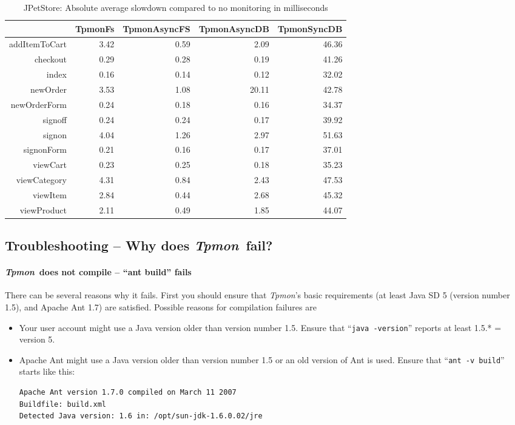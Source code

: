 \documentclass[a4paper,12pt]{scrartcl}
\newcommand{\tpmon}{\textit{Tpmon}}
\begin{document}
\begin{table}
\centering
\begin{tabular}{rrrrr}
  \hline
 & TpmonFs & TpmonAsyncFS & TpmonAsyncDB & TpmonSyncDB \\
  \hline
addItemToCart & 3.42 & 0.59 & 2.09 & 46.36 \\
  checkout & 0.29 & 0.28 & 0.19 & 41.26 \\
  index & 0.16 & 0.14 & 0.12 & 32.02 \\
  newOrder & 3.53 & 1.08 & 20.11 & 42.78 \\
  newOrderForm & 0.24 & 0.18 & 0.16 & 34.37 \\
  signoff & 0.24 & 0.24 & 0.17 & 39.92 \\
  signon & 4.04 & 1.26 & 2.97 & 51.63 \\
  signonForm & 0.21 & 0.16 & 0.17 & 37.01 \\
  viewCart & 0.23 & 0.25 & 0.18 & 35.23 \\
  viewCategory & 4.31 & 0.84 & 2.43 & 47.53 \\
  viewItem & 2.84 & 0.44 & 2.68 & 45.32 \\
  viewProduct & 2.11 & 0.49 & 1.85 & 44.07 \\
   \hline
\end{tabular}\caption{JPetStore: Absolute average slowdown compared to no monitoring in milliseconds}\label{generatedTpmonPerfTabel2}
\end{table}




\subsection{Troubleshooting -- Why does \tpmon\ fail?}
\paragraph{\tpmon\ does not compile -- ``ant build'' fails} There can be several reasons why it fails. First you should ensure that
\tpmon's basic requirements (at least Java SD 5 (version number 1.5), and Apache Ant 1.7) are satisfied. Possible reasons for compilation failures are 
\begin{itemize}
 \item Your user account might use a Java version older than version number 1.5. Ensure that ``\texttt{java -version}'' reports at least 1.5.*  = version 5. 
\item Apache Ant might use a Java version older than version number 1.5 or an old version of Ant is used. Ensure that ``\texttt{ant -v build}'' starts like this: \begin{lstlisting}[]
Apache Ant version 1.7.0 compiled on March 11 2007
Buildfile: build.xml
Detected Java version: 1.6 in: /opt/sun-jdk-1.6.0.02/jre
\end{lstlisting}
\end{itemize}
\end{document}
